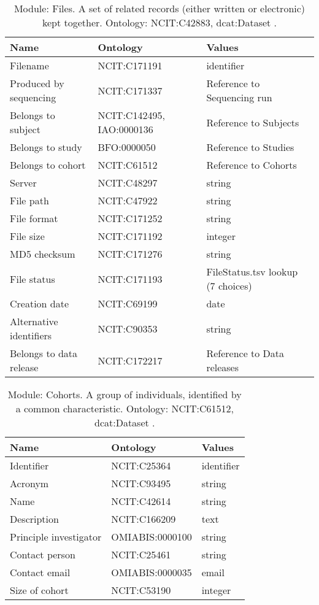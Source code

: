 \documentclass{article}
\begin{document}
\begin{table}[htb]
\begin{tabular}{lll}
Name & Ontology & Values \\
\hline
Filename & NCIT:C171191  & identifier \\
Produced by sequencing & NCIT:C171337  & Reference to Sequencing run \\
Belongs to subject & NCIT:C142495, IAO:0000136  & Reference to Subjects \\
Belongs to study & BFO:0000050  & Reference to Studies \\
Belongs to cohort & NCIT:C61512  & Reference to Cohorts \\
Server & NCIT:C48297  & string \\
File path & NCIT:C47922  & string \\
File format & NCIT:C171252  & string \\
File size & NCIT:C171192  & integer \\
MD5 checksum & NCIT:C171276  & string \\
File status & NCIT:C171193  & FileStatus.tsv lookup (7 choices) \\
Creation date & NCIT:C69199  & date \\
Alternative identifiers & NCIT:C90353  & string \\
Belongs to data release & NCIT:C172217  & Reference to Data releases \\
\hline
\end{tabular}
\caption[Module: Files]{\label{table:table11} Module: Files. A set of related records (either written or electronic) kept together. Ontology: NCIT:C42883, dcat:Dataset . }
\end{table}

\begin{table}[htb]
\begin{tabular}{lll}
Name & Ontology & Values \\
\hline
Identifier & NCIT:C25364  & identifier \\
Acronym & NCIT:C93495  & string \\
Name & NCIT:C42614  & string \\
Description & NCIT:C166209  & text \\
Principle investigator & OMIABIS:0000100  & string \\
Contact person & NCIT:C25461  & string \\
Contact email & OMIABIS:0000035  & email \\
Size of cohort & NCIT:C53190  & integer \\
\hline
\end{tabular}
\caption[Module: Cohorts]{\label{table:table12} Module: Cohorts. A group of individuals, identified by a common characteristic. Ontology: NCIT:C61512, dcat:Dataset . }
\end{table}
\end{document}
